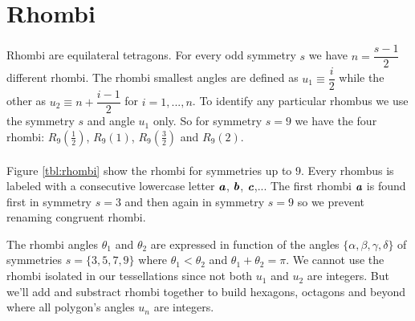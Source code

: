 \documentclass[11pt]{article}
\def\mathbi#1{\textbf{\em #1}}
\begin{document}
\section{Rhombi}

Rhombi are equilateral tetragons. For every odd symmetry $s$ we have $n = \dfrac{s-1}2$ different rhombi. The rhombi smallest angles are defined as $u_1 \equiv \dfrac{i}2$ while the other as $u_2 \equiv n + \dfrac{i-1}2$ for $i = 1,...,n$. To identify any particular rhombus we use the symmetry $s$ and angle $u_1$ only. So for symmetry $s=9$ we have the four rhombi: $R_9\left(\frac{1}2\right)$, $R_9(1)$, $R_9\left(\frac{3}2\right)$ and $R_9(2)$.
\\\\
Figure \ref{tbl:rhombi} show the rhombi for symmetries up to $9$. Every rhombus is labeled with a consecutive lowercase letter $\mathbi{a}$, $\mathbi{b}$, $\mathbi{c}$,... The first rhombi $\mathbi{a}$ is found first in symmetry $s=3$ and then again in symmetry $s=9$ so we prevent renaming congruent rhombi.

The rhombi angles $\theta_1$ and $\theta_2$ are expressed in function of the angles $\{\alpha,\beta,\gamma,\delta\}$ of symmetries $s=\{3,5,7,9\}$ where $\theta_1 < \theta_2$ and $\theta_1 + \theta_2 = \pi$. We cannot use the rhombi isolated in our tessellations since not both $u_1$ and $u_2$ are integers. But we'll add and substract rhombi together to build hexagons, octagons and beyond where all polygon's angles $u_n$ are integers.
\end{document}
